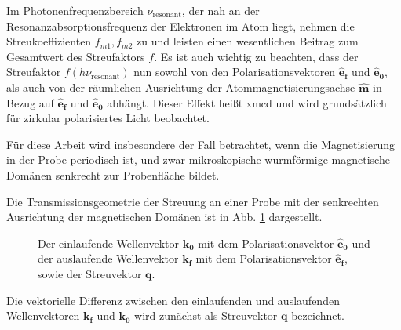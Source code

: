 \noindent
Im Photonenfrequenzbereich $\nu_\text{resonant}$, der nah an der Resonanzabsorptionsfrequenz der Elektronen im Atom liegt, nehmen die Streukoeffizienten $f_{m1}, f_{m2}$ zu und leisten einen wesentlichen Beitrag zum Gesamtwert des Streufaktors $f$. Es ist auch wichtig zu beachten, dass der Streufaktor $f(h\nu_\text{resonant})$ nun sowohl von den Polarisationsvektoren $\mathbf{\hat{e}_f}$ und $\mathbf{\hat{e}_0}$, als auch von der räumlichen Ausrichtung der Atommagnetisierungsachse $\mathbf{\hat{m}}$ in Bezug auf $\mathbf{\hat{e}_f}$ und $\mathbf{\hat{e}_0}$ abhängt. Dieser Effekt heißt \gls{xmcd} und wird grundsätzlich für zirkular polarisiertes Licht beobachtet.

\noindent
Für diese Arbeit wird insbesondere der Fall betrachtet, wenn die Magnetisierung in der Probe periodisch ist, und zwar mikroskopische wurmförmige magnetische Domänen senkrecht zur Probenfläche bildet. %

\noindent
Die Transmissionsgeometrie der Streuung an einer Probe mit der senkrechten Ausrichtung der magnetischen Domänen ist in Abb. \ref{fig:transmission_geometrie} dargestellt.
\begin{figure}[H]
    \centering
    
    \caption{Der einlaufende Wellenvektor $\mathbf{k_0}$ mit dem Polarisationsvektor $\mathbf{\hat{e}_0}$ und der auslaufende Wellenvektor $\mathbf{k_f}$ mit dem Polarisationsvektor $\mathbf{\hat{e}_f}$, sowie der Streuvektor $\mathbf{q}$.}
    \label{fig:transmission_geometrie}
\end{figure}
\noindent
Die vektorielle Differenz zwischen den einlaufenden und auslaufenden  Wellenvektoren $\mathbf{k_f}$ und $\mathbf{k_0}$ wird zunächst als Streuvektor $\mathbf{q}$ bezeichnet.

